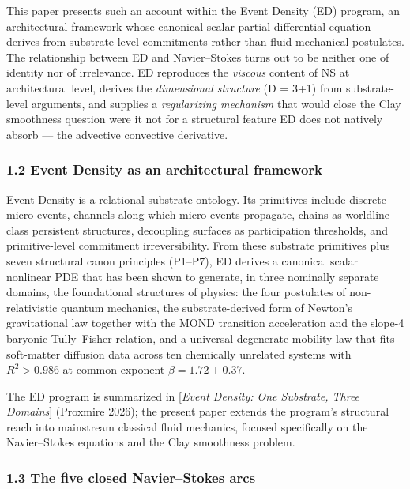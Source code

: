 \documentclass[
  11pt,a4paper]{article}
\begin{document}
This paper presents such an account within the Event Density (ED)
program, an architectural framework whose canonical scalar partial
differential equation derives from substrate-level commitments rather
than fluid-mechanical postulates. The relationship between ED and
Navier--Stokes turns out to be neither one of identity nor of
irrelevance. ED reproduces the \emph{viscous} content of NS at
architectural level, derives the \emph{dimensional structure} (D = 3+1)
from substrate-level arguments, and supplies a \emph{regularizing
mechanism} that would close the Clay smoothness question were it not for
a structural feature ED does not natively absorb --- the advective
convective derivative.

\subsubsection{1.2 Event Density as an architectural
framework}\label{event-density-as-an-architectural-framework}

Event Density is a relational substrate ontology. Its primitives include
discrete micro-events, channels along which micro-events propagate,
chains as worldline-class persistent structures, decoupling surfaces as
participation thresholds, and primitive-level commitment
irreversibility. From these substrate primitives plus seven structural
canon principles (P1--P7), ED derives a canonical scalar nonlinear PDE
that has been shown to generate, in three nominally separate domains,
the foundational structures of physics: the four postulates of
non-relativistic quantum mechanics, the substrate-derived form of
Newton's gravitational law together with the MOND transition
acceleration and the slope-4 baryonic Tully--Fisher relation, and a
universal degenerate-mobility law that fits soft-matter diffusion data
across ten chemically unrelated systems with \(R^2 > 0.986\) at common
exponent \(\beta = 1.72 \pm 0.37\).

The ED program is summarized in {[}\emph{Event Density: One Substrate,
Three Domains}{]} (Proxmire 2026); the present paper extends the
program's structural reach into mainstream classical fluid mechanics,
focused specifically on the Navier--Stokes equations and the Clay
smoothness problem.

\subsubsection{1.3 The five closed Navier--Stokes
arcs}\label{the-five-closed-navierstokes-arcs}
\end{document}
